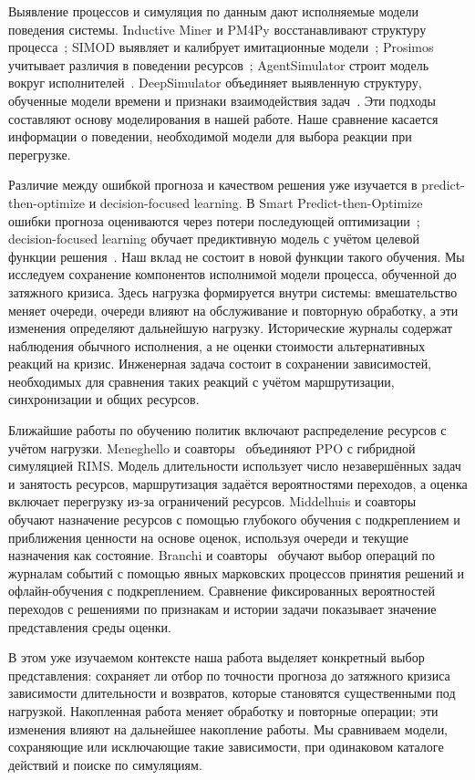 Выявление процессов и симуляция по данным дают исполняемые модели поведения системы. Inductive Miner и PM4Py восстанавливают структуру процесса~\cite{inductive,pm4py}; SIMOD выявляет и калибрует имитационные модели~\cite{simod}; Prosimos учитывает различия в поведении ресурсов~\cite{prosimos}; AgentSimulator строит модель вокруг исполнителей~\cite{agents}. DeepSimulator объединяет выявленную структуру, обученные модели времени и признаки взаимодействия задач~\cite{deepsimulator}. Эти подходы составляют основу моделирования в нашей работе. Наше сравнение касается информации о поведении, необходимой модели для выбора реакции при перегрузке.

Различие между ошибкой прогноза и качеством решения уже изучается в predict-then-optimize и decision-focused learning. В Smart Predict-then-Optimize ошибки прогноза оцениваются через потери последующей оптимизации~\cite{spo}; decision-focused learning обучает предиктивную модель с учётом целевой функции решения~\cite{dflsurvey}. Наш вклад не состоит в новой функции такого обучения. Мы исследуем сохранение компонентов исполнимой модели процесса, обученной до затяжного кризиса. Здесь нагрузка формируется внутри системы: вмешательство меняет очереди, очереди влияют на обслуживание и повторную обработку, а эти изменения определяют дальнейшую нагрузку. Исторические журналы содержат наблюдения обычного исполнения, а не оценки стоимости альтернативных реакций на кризис. Инженерная задача состоит в сохранении зависимостей, необходимых для сравнения таких реакций с учётом маршрутизации, синхронизации и общих ресурсов.

Ближайшие работы по обучению политик включают распределение ресурсов с учётом нагрузки. Meneghello и соавторы~\cite{hybridpolicy} объединяют PPO с гибридной симуляцией RIMS. Модель длительности использует число незавершённых задач и занятость ресурсов, маршрутизация задаётся вероятностями переходов, а оценка включает перегрузку из-за ограничений ресурсов. Middelhuis и соавторы~\cite{resourcepolicy} обучают назначение ресурсов с помощью глубокого обучения с подкреплением и приближения ценности на основе оценок, используя очереди и текущие назначения как состояние. Branchi и соавторы~\cite{rlpolicies} обучают выбор операций по журналам событий с помощью явных марковских процессов принятия решений и офлайн-обучения с подкреплением. Сравнение фиксированных вероятностей переходов с решениями по признакам и истории задачи показывает значение представления среды оценки.

В этом уже изучаемом контексте наша работа выделяет конкретный выбор представления: сохраняет ли отбор по точности прогноза до затяжного кризиса зависимости длительности и возвратов, которые становятся существенными под нагрузкой. Накопленная работа меняет обработку и повторные операции; эти изменения влияют на дальнейшее накопление работы. Мы сравниваем модели, сохраняющие или исключающие такие зависимости, при одинаковом каталоге действий и поиске по симуляциям.

